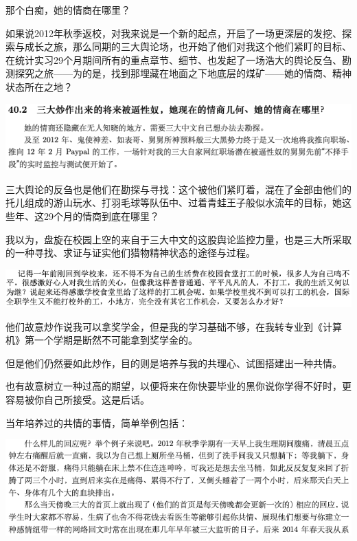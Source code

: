 \documentclass[9pt, b5paper]{article}
\begin{document}
那个白痴，她的情商在哪里？

如果说2012年秋季返校，对我来说是一个新的起点，开启了一场更深层的发挖、探索与成长之旅，那么同期的三大舆论场，也开始了他们对我这个他们紧盯的目标、在统计实习29个月期间所有的重点章节、细节、也发起了一场浩大的舆论反刍、勘测探究之旅——为的是，找到那埋藏在地面之下地底层的煤矿——她的情商、精神状态所在之地？

\begin{center}
\includegraphics[width=.9\linewidth]{./pic/backups_plans_20210424_101221.png}
\end{center}

三大舆论的反刍也是他们在勘探与寻找：这个被他们紧盯着，混在了全部由他们的托儿组成的游山玩水、打羽毛球等队伍中、过着青蛙王子般似水流年的目标，她这些年、这29个月的情商到底在哪里？

我以为，盘旋在校园上空的来自于三大中文的这股舆论监控力量，也是三大所采取的一种寻找、求证与证实他们猎物精神状态的途径与过程。

\begin{center}
\includegraphics[width=.9\linewidth]{./pic/backups_plans_20210424_220444.png}
\end{center}

他们故意炒作说我可以拿奖学金，但是我的学习基础不够，在我转专业到《计算机》第一个学期是断然不可能拿到奖学金的。

但是他们仍然要如此炒作，目的则是培养与我的共理心、试图搭建出一种共情。

也有故意树立一种过高的期望，以便将来在你快要毕业的黑你说你学得不好时，更容易被你自己所接受。这是后话。 

当年培养过的共情的事情，简单举例包括：

\begin{center}
\includegraphics[width=.9\linewidth]{./pic/backups_plans_20210501_092102.png}
\end{center}
\end{document}
